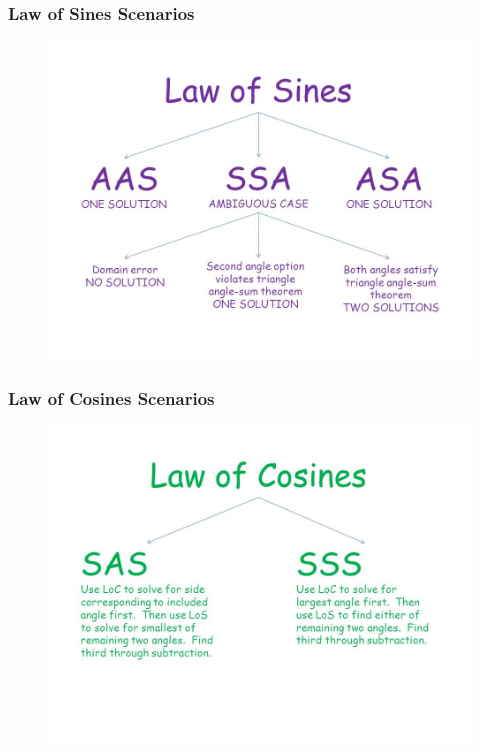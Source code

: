 \documentclass[xcolor=dvipsnames]{beamer}
\begin{document}
\begin{frame}
  \frametitle{Law of Sines Scenarios}
      \begin{figure}[h]
    \includegraphics[scale=.4]{./law_of_sines_cases.jpg}
  \end{figure}
\end{frame}

\begin{frame}
  \frametitle{Law of Cosines Scenarios}
      \begin{figure}[h]
    \includegraphics[scale=.4]{./law_of_cosines_cases.jpg}
  \end{figure}
\end{frame}
\end{document}
